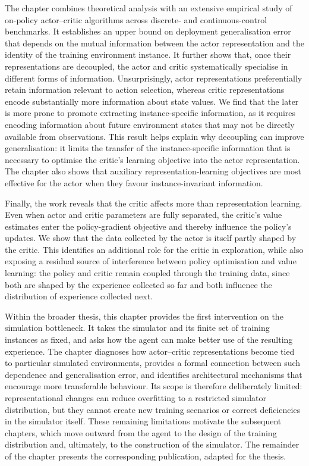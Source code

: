The chapter combines theoretical analysis with an extensive empirical study of on-policy actor--critic algorithms across discrete- and continuous-control benchmarks. It establishes an upper bound on deployment generalisation error that depends on the mutual information between the actor representation and the identity of the training environment instance. It further shows that, once their representations are decoupled, the actor and critic systematically specialise in different forms of information. Unsurprisingly, actor representations preferentially retain information relevant to action selection, whereas critic representations encode substantially more information about state values. We find that the later is more prone to promote extracting instance-specific information, as it requires encoding information about future environment states that may not be directly available from observations.  This result helps explain why decoupling can improve generalisation: it limits the transfer of the instance-specific information that is necessary to optimise the critic's learning objective into the actor representation. The chapter also shows that auxiliary representation-learning objectives are most effective for the actor when they favour instance-invariant information.

Finally, the work reveals that the critic affects more than representation learning. Even when actor and critic parameters are fully separated, the critic's value estimates enter the policy-gradient objective and thereby influence the policy's updates. We show that the data collected by the actor is itself partly shaped by the critic. This identifies an additional role for the critic in exploration, while also exposing a residual source of interference between policy optimisation and value learning: the policy and critic remain coupled through the training data, since both are shaped by the experience collected so far and both influence the distribution of experience collected next.

Within the broader thesis, this chapter provides the first intervention on the simulation bottleneck. It takes the simulator and its finite set of training instances as fixed, and asks how the agent can make better use of the resulting experience. The chapter diagnoses how actor--critic representations become tied to particular simulated environments, provides a formal connection between such dependence and generalisation error, and identifies architectural mechanisms that encourage more transferable behaviour. Its scope is therefore deliberately limited: representational changes can reduce overfitting to a restricted simulator distribution, but they cannot create new training scenarios or correct deficiencies in the simulator itself. These remaining limitations motivate the subsequent chapters, which move outward from the agent to the design of the training distribution and, ultimately, to the construction of the simulator. The remainder of the chapter presents the corresponding publication, adapted for the thesis.

